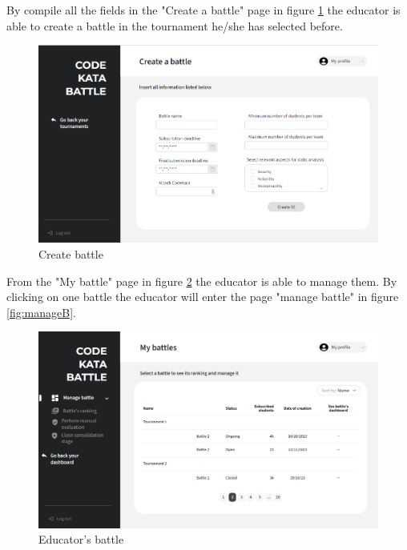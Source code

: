 By compile all the fields in the "Create a battle" page in figure \ref{fig:createB} the educator is able to create a battle in the tournament he/she has selected before.
\begin{figure}[h]
    \centering
    \includegraphics[width=\textwidth]{images/mockups/educators/createB.png}
    \caption{Create battle}
    \label{fig:createB}
\end{figure}

From the "My battle" page in figure \ref{fig:EmyB} the educator is able to manage them. By clicking on one battle the educator will enter the page "manage battle" in figure \ref{fig:manageB}.
\begin{figure}[h]
    \centering
    \includegraphics[width=\textwidth]{images/mockups/educators/MyBattles.png}
    \caption{Educator's battle}
    \label{fig:EmyB}
\end{figure}

